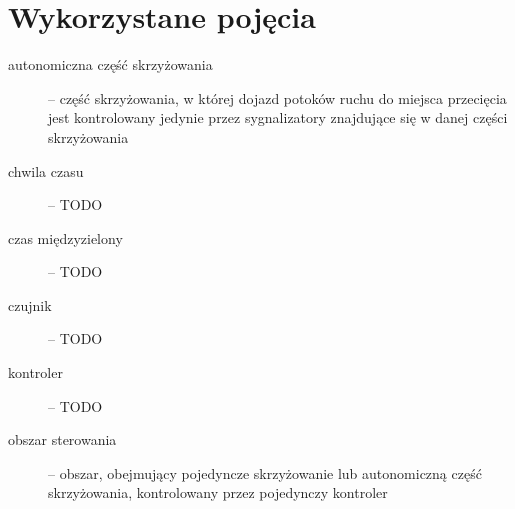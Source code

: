 \chapter{Wykorzystane pojęcia}

\begin{description}

\item[autonomiczna część skrzyżowania] --
część skrzyżowania, w której dojazd potoków ruchu do miejsca przecięcia jest kontrolowany
jedynie przez sygnalizatory znajdujące się w danej części skrzyżowania

\item[chwila czasu] -- TODO

\item[czas międzyzielony] -- TODO

\item[czujnik] -- TODO

\item[kontroler] -- TODO

\item[obszar sterowania] --
obszar, obejmujący pojedyncze skrzyżowanie lub autonomiczną część skrzyżowania,
kontrolowany przez pojedynczy kontroler

\end{description}